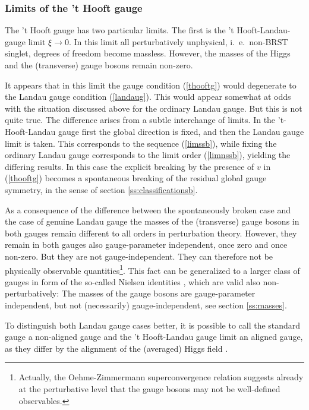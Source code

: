 \documentclass[final,twoside,12pt]{article}
\newcommand*{\pref}[1]{(\ref{#1})}
\newcommand*{\1}{1\!\!\!\bot}
\begin{document}
\subsubsection{Limits of the 't Hooft gauge}\label{ss:limitthooft}

The 't Hooft gauge has two particular limits. The first is the 't Hooft-Landau-gauge limit $\xi\to 0$. In this limit all perturbatively unphysical, i.\ e.\ non-BRST singlet, degrees of freedom become massless. However, the masses of the Higgs and the (transverse) gauge bosons remain non-zero.

It appears that in this limit the gauge condition \pref{thooftg} would degenerate to the Landau gauge condition \pref{landaug}. This would appear somewhat at odds with the situation discussed above for the ordinary Landau gauge. But this is not quite true. The difference arises from a subtle interchange of limits. In the 't-Hooft-Landau gauge first the global direction is fixed, and then the Landau gauge limit is taken. This corresponds to the sequence \pref{limssb}, while fixing the ordinary Landau gauge corresponds to the limit order \pref{limnssb}, yielding the differing results. In this case the explicit breaking by the presence of $v$ in \pref{thooftg} becomes a spontaneous breaking of the residual global gauge symmetry, in the sense of section \ref{ss:classificationsb}.

As a consequence of the difference between the spontaneously broken case and the case of genuine Landau gauge the masses of the (transverse) gauge bosons in both gauges remain different to all orders in perturbation theory. However, they remain in both gauges also gauge-parameter independent, once zero and once non-zero. But they are not gauge-independent. They can therefore not be physically observable quantities\footnote{Actually, the Oehme-Zimmermann superconvergence relation \cite{Oehme:1979ai} suggests already at the perturbative level that the gauge bosons may not be well-defined observables.}. This fact can be generalized to a larger class of gauges in form of the so-called Nielsen identities \cite{Nielsen:1975fs}, which are valid also non-perturbatively: The masses of the gauge bosons are gauge-parameter independent, but not (necessarily) gauge-independent, see section \ref{ss:masses}.

To distinguish both Landau gauge cases better, it is possible to call the standard gauge a non-aligned gauge and the 't Hooft-Landau gauge limit an aligned gauge, as they differ by the alignment of the (averaged) Higgs field \cite{Maas:2012ct}. 
\end{document}
